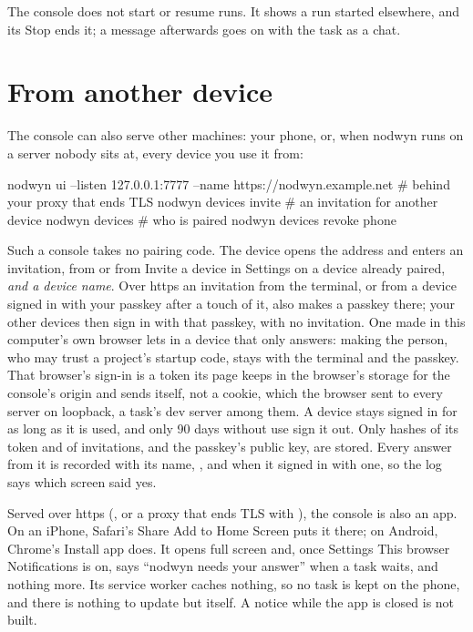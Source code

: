 The console does not start or resume runs. It shows a run started
elsewhere, and its Stop ends it; a message afterwards goes on with the
task as a chat.

\section{From another device}

The console can also serve other machines: your phone, or, when nodwyn runs
on a server nobody sits at, every device you use it from:

\begin{sh}
nodwyn ui --listen 127.0.0.1:7777 --name https://nodwyn.example.net  # behind your proxy that ends TLS
nodwyn devices invite                        # an invitation for another device
nodwyn devices                               # who is paired
nodwyn devices revoke phone
\end{sh}

Such a console takes no pairing code. The device opens the address and
enters an invitation, from  or from Invite a
device in Settings on a device already paired, \emph{and a device name}.
Over https an invitation from the terminal, or from a device signed in
with your passkey after a touch of it, also makes a passkey there; your
other devices then sign in with that passkey, with no invitation. One made
in this computer's own browser lets in a device that only answers: making the
person, who may trust a project's startup code, stays with the terminal and
the passkey. That browser's sign-in is a token its page keeps in the
browser's storage for the console's origin and sends itself, not a cookie,
which the browser sent to every server on loopback, a task's dev server among
them. A device stays signed
in for as long as it is used, and only 90 days without use sign it out.
Only hashes of its token and of invitations, and the passkey's public key,
are stored. Every answer from it is recorded with its name, , and  when it signed in with one, so the log
says which screen said yes.

Served over https (, or a proxy that ends TLS with
), the console is also an app. On an iPhone,
Safari's Share \textrightarrow{} Add to Home Screen puts it there; on Android,
Chrome's Install app does. It opens full screen and, once Settings
\textrightarrow{} This browser \textrightarrow{} Notifications is on, says
``nodwyn needs your answer'' when a task waits, and nothing more. Its service
worker caches nothing, so no task is kept on the phone, and there is nothing
to update but \nodwyn{} itself. A notice while the app is closed is not
built.

